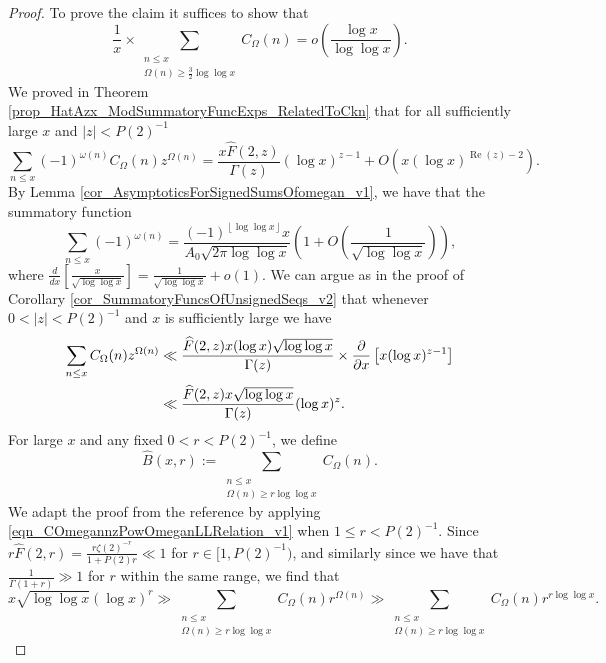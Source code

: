 \documentclass[11pt,reqno,a4letter]{article}
\numberwithin{figure}{section}
\numberwithin{table}{section}
\newcommand{\cf}{\textit{cf.\ }}
\newcommand{\floor}[1]{\left\lfloor #1 \right\rfloor}
\theoremstyle{plain}
\numberwithin{theorem}{section}
\theoremstyle{definition}
\renewcommand{\Re}{\operatorname{Re}}
\begin{document}
\begin{proof}
To prove the claim it suffices to show that 
\begin{equation} 
\label{eqn_proof_tag_PartialSumsOver_HatCkx_EquivCond_v2} 
\frac{1}{x} \times 
     \sum\limits_{\substack{n \leq x \\ \Omega(n) \geq \frac{3}{2} \log\log x}} C_{\Omega}(n)
     = o\left(\frac{\log x}{\log\log x}\right). 
\end{equation} 
We proved in Theorem \ref{prop_HatAzx_ModSummatoryFuncExps_RelatedToCkn} 
that for all sufficiently large $x$ and $|z| < P(2)^{-1}$ 
\[
\sum_{n \leq x} (-1)^{\omega(n)} C_{\Omega}(n) z^{\Omega(n)} = 
     \frac{x \widehat{F}(2, z)}{\Gamma(z)} (\log x)^{z-1} + O\left( 
     x (\log x)^{\Re(z)-2}\right). 
\]
By Lemma \ref{cor_AsymptoticsForSignedSumsOfomegan_v1}, 
we have that the summatory function 
\[
\sum_{n \leq x} (-1)^{\omega(n)} = 
     \frac{(-1)^{\floor{\log\log x}} x}{A_0 \sqrt{2\pi \log\log x}} 
     \left(1+O\left(\frac{1}{\sqrt{\log\log x}}\right)\right), 
\]
where $\frac{d}{dx}\left[\frac{x}{\sqrt{\log\log x}}\right] = \frac{1}{\sqrt{\log\log x}} + o(1)$. 
We can argue as in the proof of Corollary \ref{cor_SummatoryFuncsOfUnsignedSeqs_v2} 
that whenever $0 < |z| < P(2)^{-1}$ and $x$ is sufficiently large we have 
\begin{align}
\notag
\sum_{n \leq x} C_{\Omega}(n) z^{\Omega(n)} & \ll 
     \frac{\widehat{F}(2, z) x (\log x) \sqrt{\log\log x}}{\Gamma(z)} \times 
     \frac{\partial}{\partial x}\left[x (\log x)^{z-1}\right] \\ 
\label{eqn_COmegannzPowOmeganLLRelation_v1} 
     & \ll 
     \frac{\widehat{F}(2, z) x \sqrt{\log\log x}}{\Gamma(z)} (\log x)^{z}. 
\end{align}
For large $x$ and any fixed $0 < r < P(2)^{-1}$, we define 
\[
\widehat{B}(x, r) := \sum_{\substack{n \leq x \\ \Omega(n) \geq r\log\log x}} 
     C_{\Omega}(n). 
\]
We adapt the proof from the reference \cite[\cf Thm.\ 7.20; \S 7.4]{MV} by 
applying \eqref{eqn_COmegannzPowOmeganLLRelation_v1} when $1 \leq r < P(2)^{-1}$. 
Since $r \widehat{F}(2, r) = \frac{r \zeta(2)^{-r}}{1+P(2)r} \ll 1$ 
for $r \in [1, P(2)^{-1})$, and similarly since we have that 
$\frac{1}{\Gamma(1+r)} \gg 1$ for $r$ within the same range, 
we find that 
\[
x \sqrt{\log\log x} (\log x)^{r} \gg \sum_{\substack{n \leq x \\ \Omega(n) \geq r\log\log x}} 
     C_{\Omega}(n) r^{\Omega(n)} \gg 
     \sum_{\substack{n \leq x \\ \Omega(n) \geq r\log\log x}} 
     C_{\Omega}(n) r^{r \log\log x}. 
\]
\end{proof}
\end{document}
